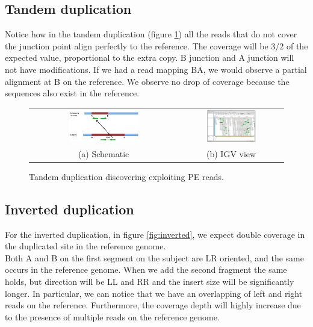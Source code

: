 \subsection{Tandem duplication}
Notice how in the tandem duplication (figure \ref{fig:tandem}) all the reads that do not cover the junction point align perfectly to the reference.
The coverage will be 3/2 of the expected value, proportional to the extra copy. B junction and A junction will not have modifications. If we had a read mapping BA, we would observe a partial alignment at B on the reference.
We observe no drop of coverage because the sequences also exist in the reference. \\


\begin{figure}[H]
\begin{tabular}{cc}
  \includegraphics[width=0.5\textwidth]{tandem.png} &   \includegraphics[width=0.5\textwidth]{tandem_igv.png} \\
(a) Schematic & (b) IGV view \\[6pt]
\end{tabular}
\caption{Tandem duplication discovering exploiting PE reads.}
\label{fig:tandem}
\end{figure}

\subsection{Inverted duplication}
For the inverted duplication, in figure \ref{fig:inverted}, we expect double coverage in the duplicated site in the reference genome. \\
Both A and B on the first segment on the subject are LR oriented, and the same occurs in the reference genome.
When we add the second fragment the same holds, but direction will be LL and RR and the insert size will be significantly longer. In particular, we can notice that we have an overlapping of left and right reads on the reference. Furthermore, the coverage depth will highly increase due to the presence of multiple reads on the reference genome.

